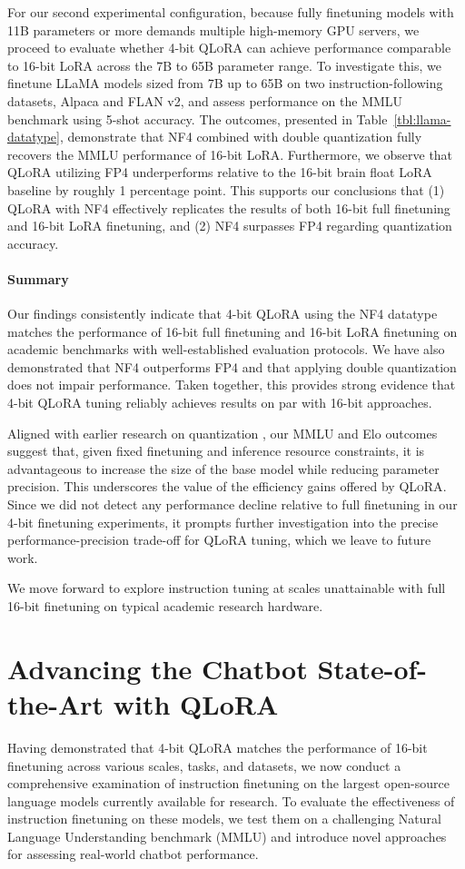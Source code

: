 For our second experimental configuration, because fully finetuning models with 11B parameters or more demands multiple high-memory GPU servers, we proceed to evaluate whether 4-bit \textsc{QLoRA} can achieve performance comparable to 16-bit LoRA across the 7B to 65B parameter range. To investigate this, we finetune LLaMA models sized from 7B up to 65B on two instruction-following datasets, Alpaca and FLAN v2, and assess performance on the MMLU benchmark using 5-shot accuracy. The outcomes, presented in Table~\ref{tbl:llama-datatype}, demonstrate that NF4 combined with double quantization fully recovers the MMLU performance of 16-bit LoRA. Furthermore, we observe that \textsc{QLoRA} utilizing FP4 underperforms relative to the 16-bit brain float LoRA baseline by roughly 1 percentage point. This supports our conclusions that (1) \textsc{QLoRA} with NF4 effectively replicates the results of both 16-bit full finetuning and 16-bit LoRA finetuning, and (2) NF4 surpasses FP4 regarding quantization accuracy.

\paragraph{Summary} Our findings consistently indicate that 4-bit \textsc{QLoRA} using the NF4 datatype matches the performance of 16-bit full finetuning and 16-bit LoRA finetuning on academic benchmarks with well-established evaluation protocols. We have also demonstrated that NF4 outperforms FP4 and that applying double quantization does not impair performance. Taken together, this provides strong evidence that 4-bit \textsc{QLoRA} tuning reliably achieves results on par with 16-bit approaches.

Aligned with earlier research on quantization \citep{dettmers2022case}, our MMLU and Elo outcomes suggest that, given fixed finetuning and inference resource constraints, it is advantageous to increase the size of the base model while reducing parameter precision. This underscores the value of the efficiency gains offered by \textsc{QLoRA}. Since we did not detect any performance decline relative to full finetuning in our 4-bit finetuning experiments, it prompts further investigation into the precise performance-precision trade-off for QLoRA tuning, which we leave to future work.

We move forward to explore instruction tuning at scales unattainable with full 16-bit finetuning on typical academic research hardware.

\section{Advancing the Chatbot State-of-the-Art with QLoRA}
\label{sec:pushing}
Having demonstrated that 4-bit \textsc{QLoRA} matches the performance of 16-bit finetuning across various scales, tasks, and datasets, we now conduct a comprehensive examination of instruction finetuning on the largest open-source language models currently available for research. To evaluate the effectiveness of instruction finetuning on these models, we test them on a challenging Natural Language Understanding benchmark (MMLU) and introduce novel approaches for assessing real-world chatbot performance.

